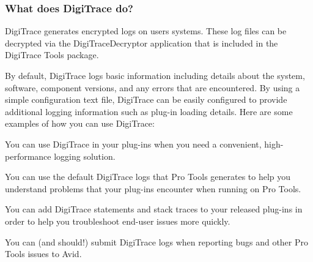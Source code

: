 \hypertarget{a00834_digitrace__intro__whatdoesitdo}{}\subsubsection{What does Digi\+Trace do?}\label{a00834_digitrace__intro__whatdoesitdo}
 Digi\+Trace generates encrypted logs on users\textquotesingle{} systems. These log files can be decrypted via the Digi\+Trace\+Decryptor application that is included in the Digi\+Trace Tools package.

 By default, Digi\+Trace logs basic information including details about the system, software, component versions, and any errors that are encountered. By using a simple configuration text file, Digi\+Trace can be easily configured to provide additional logging information such as plug-\/in loading details. Here are some examples of how you can use Digi\+Trace\+:

 
\begin{DoxyItemize}
\item You can use Digi\+Trace in your plug-\/ins when you need a convenient, high-\/performance logging solution.  
\item You can use the default Digi\+Trace logs that Pro Tools generates to help you understand problems that your plug-\/ins encounter when running on Pro Tools.  
\item You can add Digi\+Trace statements and stack traces to your released plug-\/ins in order to help you troubleshoot end-\/user issues more quickly.  
\item You can (and should!) submit Digi\+Trace logs when reporting bugs and other Pro Tools issues to Avid.  
\end{DoxyItemize}



